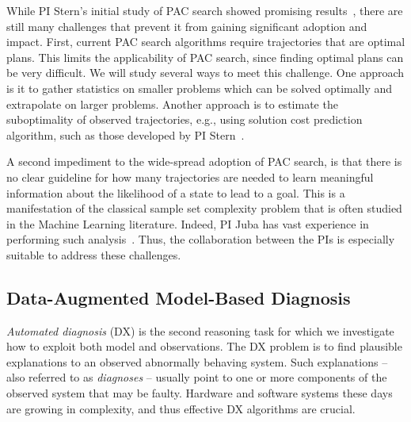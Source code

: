 \documentclass[12pt]{article}
\begin{document}

While PI Stern's initial study of PAC search showed promising results~\cite{stern2011probably,stern2012search}, there are still many challenges that prevent it from gaining significant adoption and impact. First, current PAC search algorithms require trajectories that are optimal plans. This limits the applicability of PAC search, since finding optimal plans can be very difficult. We will study several ways to meet this challenge. One approach is it to gather statistics on smaller problems which can be solved optimally and extrapolate on larger problems. Another approach is to estimate the suboptimality of observed trajectories, e.g., using solution cost prediction algorithm, such as those developed by PI Stern~\cite{lelis2016predicting,lelis2011predicting}. 



A second impediment to the wide-spread adoption of PAC search, is that there is no clear guideline for how many trajectories are needed to learn meaningful information about the likelihood of a state to lead to a goal. This is a manifestation of the classical sample set complexity problem that is often studied in the Machine Learning literature. Indeed, PI Juba has vast experience in performing such analysis~\cite{goldreich2012theory,juba2013ijcai,juba2016jmlr,juba2016aaai}. Thus, the collaboration between the PIs is especially suitable to address these challenges. 



\subsection{Data-Augmented Model-Based Diagnosis}


{\em Automated diagnosis} (DX) is the second reasoning task for which we investigate how to exploit both model and observations. The DX problem is to find plausible explanations to an observed abnormally behaving system. Such explanations -- also referred to as {\em diagnoses} -- usually point to one or more components of the observed system that may be faulty. 
Hardware and software systems these days are growing in complexity, and thus effective DX algorithms are crucial. 
\end{document}
